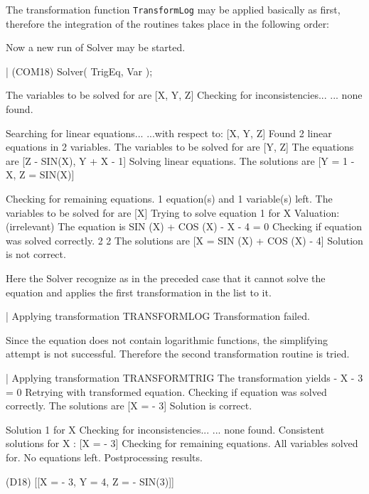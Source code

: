 The transformation function \verb+TransformLog+ may be applied basically as first, therefore the integration of the routines takes place in the following order:

Now a new run of Solver may be started.
\begin{literatim}{|}
(COM18) Solver( TrigEq, Var );

The variables to be solved for are [X, Y, Z]
Checking for inconsistencies...
... none found.

Searching for linear equations...
  ...with respect to: [X, Y, Z]
Found 2 linear equations in 2 variables.
The variables to be solved for are [Y, Z]
The equations are [Z - SIN(X), Y + X - 1]
Solving linear equations.
The solutions are [Y = 1 - X, Z = SIN(X)]

Checking for remaining equations.
1 equation(s) and 1 variable(s) left.
The variables to be solved for are [X]
Trying to solve equation 1 for X
Valuation: (irrelevant)
The equation is SIN (X) + COS (X) - X - 4 = 0
Checking if equation was solved correctly.
                          2         2
The solutions are [X = SIN (X) + COS (X) - 4]
Solution is not correct.
\end{literatim}

Here the Solver recognize as in the preceded case that it cannot solve the equation and applies the first transformation in the list to it.
\begin{literatim}{|}
Applying transformation TRANSFORMLOG
Transformation failed.
\end{literatim}

Since the equation does not contain logarithmic functions, the simplifying attempt is not successful. Therefore the second transformation routine is tried.
\begin{literatim}{|}
Applying transformation TRANSFORMTRIG
The transformation yields - X - 3 = 0
Retrying with transformed equation.
Checking if equation was solved correctly.
The solutions are [X = - 3]
Solution is correct.

Solution 1 for X
Checking for inconsistencies...
... none found.
Consistent solutions for X : [X = - 3]
Checking for remaining equations.
All variables solved for. No equations left.
Postprocessing results.

(D18)                   [[X = - 3, Y = 4, Z = - SIN(3)]]
\end{literatim}

